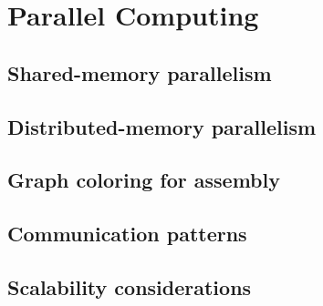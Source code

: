 \chapter{Parallel Computing}
\label{ch:parallel}

\section{Shared-memory parallelism}
\label{sec:parallel:shared}


\section{Distributed-memory parallelism}
\label{sec:parallel:distributed}


\section{Graph coloring for assembly}
\label{sec:parallel:coloring}


\section{Communication patterns}
\label{sec:parallel:comm}


\section{Scalability considerations}
\label{sec:parallel:scalability}

